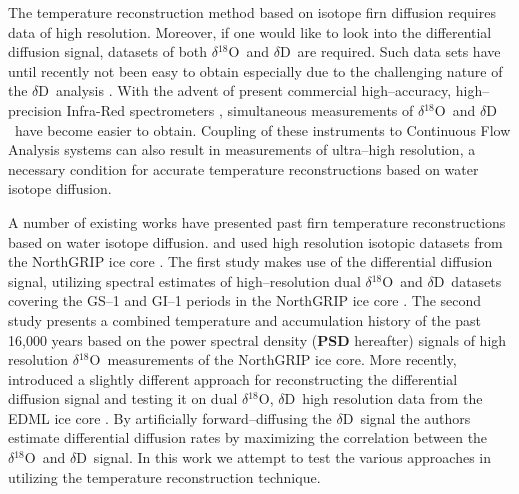 \documentclass[11pt, draftcls, onecolumn]{IEEEtran} %
\numberwithin{equation}{section}
\numberwithin{table}{section}
\numberwithin{figure}{section}
\newcommand{\delOx}{$\delta{}^{18}\mathrm{O}$}
\newcommand{\delD}{$\delta\mathrm{D}$}
\begin{document}
The temperature reconstruction method based on isotope firn diffusion requires 
data of high resolution. Moreover, if one would like to look into the differential diffusion signal, 
datasets of both \delOx~and \delD~are required. Such data sets have until recently not been easy to
obtain especially due to the challenging nature of the \delD~analysis \citep{BIGELEISEN1952, Vaughn1998}.
With the advent of present 	commercial high--accuracy, high--precision Infra-Red spectrometers 
\citep{Crosson2008, Brand2009}, simultaneous measurements of \delOx~and \delD~have become 
easier to obtain. Coupling of these instruments to Continuous Flow Analysis systems \citep{Gkinis2011, Maselli2013, Emanuelsson2015, Jones2017a} 
can also result in measurements of ultra--high resolution, a necessary condition for 
accurate temperature reconstructions based on water isotope diffusion.

A number of existing works have presented past firn temperature reconstructions
based on water isotope diffusion. \cite{Simonsen2011} and \cite{Gkinis2014} used high resolution 
isotopic datasets from the NorthGRIP ice core \citep{NGRIPmembers2004}. The first study makes use
of the differential diffusion signal, utilizing spectral estimates of high--resolution 
dual  \delOx~and \delD~datasets covering
the GS--1 and GI--1 periods in the NorthGRIP ice core \citep{Rasmussen2014}. 
The second study 
presents a combined temperature and accumulation history of the past 16,000 years based on the 
power spectral density (\textbf{PSD} hereafter) signals of 
high resolution \delOx~measurements of the NorthGRIP ice core. More recently, \cite{vanderWel2015a}
introduced a slightly different approach for reconstructing the differential diffusion signal and testing it
on dual \delOx, \delD~high resolution data from the EDML ice core \citep{Oerter2004}. 
By artificially forward--diffusing the \delD~signal the authors estimate differential diffusion rates
by maximizing the correlation between the \delOx~and \delD~signal.  
In this work we attempt to test the various approaches in utilizing the temperature
reconstruction technique. 
\end{document}
